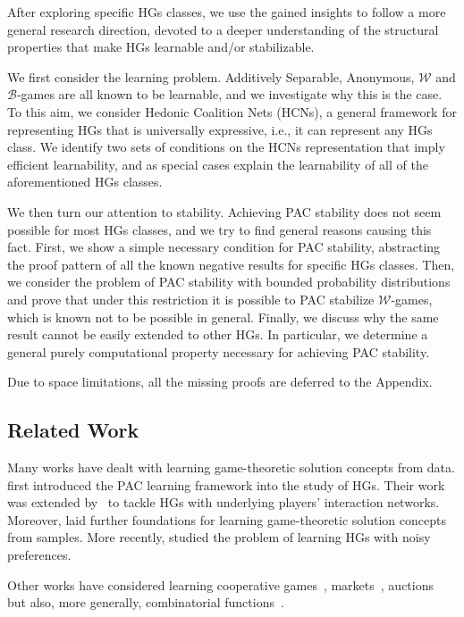 \documentclass[letterpaper]{article} %
\begin{document}
After exploring specific HGs classes, we use the gained insights to follow a more general research direction, devoted to a deeper understanding of the structural properties that make HGs learnable and/or stabilizable.

We first consider the learning problem. Additively Separable, Anonymous, $\mathcal{W}$ and $\mathcal{B}$-games are all known to be learnable, and we investigate why this is the case. To this aim, we consider Hedonic Coalition Nets (HCNs), a general framework for representing HGs that is universally expressive, i.e., it can represent any HGs class.
We identify two sets of conditions on the HCNs representation that imply efficient learnability, and as special cases explain the learnability of all of the aforementioned HGs classes.

We then turn our attention to stability. Achieving PAC stability does not seem possible for most HGs classes, and we try to find general reasons causing this fact.
First, we show a simple necessary condition for PAC stability, abstracting the proof pattern of all the known negative results for specific HGs classes.
Then, we consider the problem of PAC stability with bounded probability distributions and prove that under this restriction it is possible to PAC stabilize $\mathcal{W}$-games, which is known not to be possible in general. Finally, we discuss why the same result cannot be easily extended to other HGs. In particular, we determine a general purely computational property
necessary for achieving PAC stability.

Due to space limitations, all the missing proofs are deferred to the Appendix.

\subsection{Related Work}
Many works have dealt with learning game-theoretic solution concepts from data.
\citet{SliwinskiZ17} first introduced the PAC learning framework into the study of HGs. Their work was extended by~\citet{IgarashiSZ19} to tackle HGs with underlying players' interaction networks. Moreover, \citet{JhaZick20} laid further foundations for learning game-theoretic solution concepts from samples. More recently, \citet{HGnoisy} studied the problem of learning HGs with noisy preferences.

Other works have considered learning cooperative games~\cite{BalcanPZ15}, markets~\cite{LevPVZick21}, auctions~\cite{BalcanMultiItem} but also, more generally, combinatorial functions~\cite{BalcanPairwise, BalcanSubmodular}.
\end{document}
